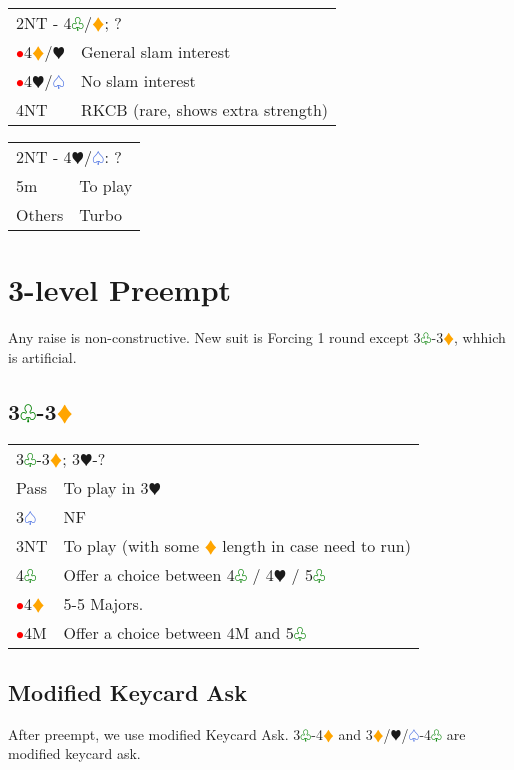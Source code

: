 \documentclass{article}
\renewcommand{\sp}{\textcolor{RoyalBlue}{$\varspade$}}
\newcommand{\he}{\textcolor{RubineRed}{$\varheart$}}
\newcommand{\di}{\textcolor{Orange}{$\vardiamond$}}
\newcommand{\cl}{\textcolor{Green}{$\varclub$}}
\newcommand{\nt}{\relsize{-1}NT\relsize{1}}
\newcommand{\al}{\textcolor{red}{$\bullet$}}
\begin{document}
\medskip

\begin{tabular}{|l|p{6.5cm}}
	\multicolumn{2}{l}{2\nt{} - 4\cl{}/\di{}; ?}\\
	\al{}4\di{}/\he{}& General slam interest \\
	\al{}4\he/\sp{} & No slam interest \\
     4\nt & RKCB (rare, shows extra strength)\\
\end{tabular}

\medskip

\begin{tabular}{|l|p{6.5cm}}
	\multicolumn{2}{l}{2\nt{} - 4\he/\sp{}: ?}\\
	5m & To play \\
	Others & Turbo \\
\end{tabular}

\section{3-level Preempt}
Any raise is non-constructive. New suit is Forcing 1 round except 3\cl{}-3\di{}, whhich is artificial.

\subsection{3\cl{}-3\di{}}

\begin{tabular}{|l|p{6.5cm}}
	\multicolumn{2}{l}{3\cl{}-3\di{}; 3\he{}-?}\\
	Pass & To play in 3\he{} \\
	3\sp{} & NF \\
	3\nt{} & To play (with some \di{} length in case need to run) \\
	4\cl{} & Offer a choice between 4\cl{} / 4\he{} / 5\cl{} \\
	\al{}4\di{} & 5-5 Majors. \\
	\al{}4M & Offer a choice between 4M and 5\cl{} \\
\end{tabular}

\subsection{Modified Keycard Ask}

After preempt, we use modified Keycard Ask. 3\cl{}-4\di{} and 3\di{}/\he{}/\sp{}-4\cl{} are modified keycard ask. \\
\end{document}
